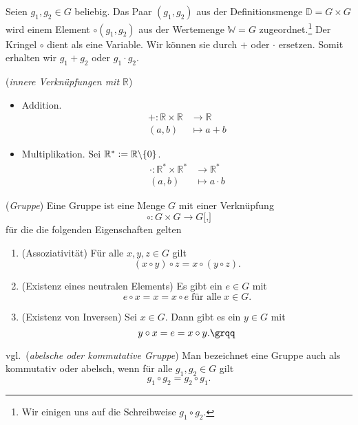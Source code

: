 Seien $g_1, g_2 \in G$ beliebig. Das Paar $(g_1,g_2)$ aus der Definitionsmenge $\mathbb{D}=G \times G$ wird einem Element $\circ(g_1, g_2)$ aus der Wertemenge $\mathbb{W}=G$ zugeordnet.\footnote{Wir einigen uns auf die Schreibweise $g_1 \circ g_2$.} Der Kringel $\circ$ dient als eine Variable. Wir können sie durch $+$ oder $\cdot$ ersetzen. Somit erhalten wir $g_1+g_2$ oder $g_1 \cdot g_2$.
\newpage
\begin{example}{(\emph{innere Verknüpfungen mit $\mathbb{R}$})} 
\label{verk}
\begin{itemize}
\item Addition. 
\begin{align*}
+: \mathbb{R} \times \mathbb{R} &\rightarrow \mathbb{R}
\\ (a,b) &\mapsto a+b
\end{align*}
\item Multiplikation. Sei $\mathbb{R}^* \vcentcolon =\mathbb{R} \backslash \{0\}$.
\begin{align*}
\cdot: \mathbb{R}^* \times \mathbb{R}^* &\rightarrow \mathbb{R}^*
\\ (a,b) &\mapsto a \cdot b
\end{align*}
\end{itemize}
\end{example}


\theoremstyle {definition}
\begin{definition} \cite[S. 19, 4.2]{Skript} (\emph{Gruppe})
\label{Gruppe}{\glqq}Eine Gruppe ist eine Menge $G$ mit einer Verknüpfung 
\[ \circ : G \times G \rightarrow G\text{[,]}\]
für die die folgenden Eigenschaften gelten
\begin{enumerate}
	\item (Assoziativität) Für alle $x, y, z \in G$ gilt 	
	\label{(i)}
	\[(x \circ y) \circ z = x \circ (y \circ z)\text{.}\]
	\item (Existenz eines neutralen Elements) Es gibt ein $e \in G$ mit  
	\label{(ii)}	
	\[e \circ x = x = x \circ e \;{\text{für alle}}\; x \in G \text{.}\]
	\item (Existenz von Inversen) Sei $x \in G$. Dann gibt es ein $y \in G$ mit 
	\label{(iii)}	
	\[y \circ x = e = x \circ y \text{.{\grqq}}\]
\end{enumerate}
\end{definition}

\begin{definition}\label{abl.Gruppe}vgl.\,\cite[S. 19, 4.3]{Skript} (\emph{abelsche oder kommutative Gruppe}) Man bezeichnet eine Gruppe auch als kommutativ oder abelsch, wenn für alle $g_1,g_2 \in G$ gilt
\[g_1 \circ g_2 = g_2 \circ g_1 \text{.}\]
\end{definition}

